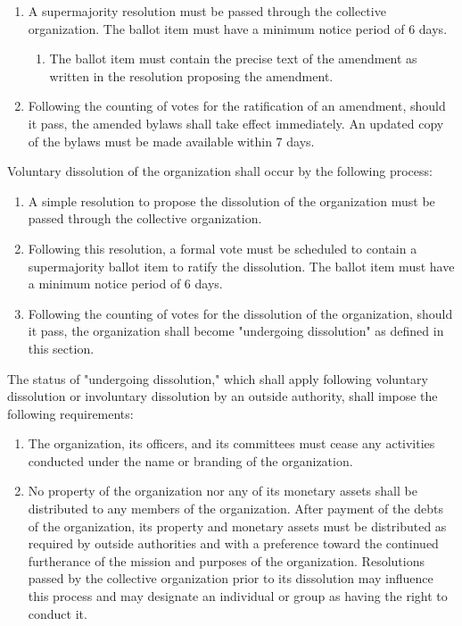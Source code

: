 \documentclass[11pt]{article}
\newcounter{h1}
\newcounter{h2}[h1]
\newcounter{h3}[h2]
\begin{document}
\begin{enumerate}
  \item A supermajority resolution must be passed through the collective organization. The ballot item must have a minimum notice period of 6 days.
  \begin{enumerate}
    \item The ballot item must contain the precise text of the amendment as written in the resolution proposing the amendment. %
  \end{enumerate}
  \item Following the counting of votes for the ratification of an amendment, should it pass, the amended bylaws shall take effect immediately. An updated copy of the bylaws must be made available within 7 days.
\end{enumerate}



Voluntary dissolution of the organization shall occur by the following process:

\begin{enumerate}
  \item A simple resolution to propose the dissolution of the organization must be passed through the collective organization.
  \item Following this resolution, a formal vote must be scheduled to contain a supermajority ballot item to ratify the dissolution. The ballot item must have a minimum notice period of 6 days.
  \item Following the counting of votes for the dissolution of the organization, should it pass, the organization shall become "undergoing dissolution" as defined in this section.
\end{enumerate}


The status of "undergoing dissolution," which shall apply following voluntary dissolution or involuntary dissolution by an outside authority, shall impose the following requirements:

\begin{enumerate}
  \item The organization, its officers, and its committees must cease any activities conducted under the name or branding of the organization.
  \item No property of the organization nor any of its monetary assets shall be distributed to any members of the organization. After payment of the debts of the organization, its property and monetary assets must be distributed as required by outside authorities and with a preference toward the continued furtherance of the mission and purposes of the organization. Resolutions passed by the collective organization prior to its dissolution may influence this process and may designate an individual or group as having the right to conduct it.
\end{enumerate}
\end{document}
